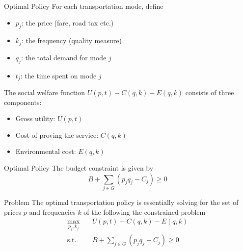 \documentclass[10pt, aspectratio=169]{beamer}
\begin{document}
\begin{frame}{Optimal Policy}
  For each transportation mode, define
  \begin{itemize}
    \item $p_j$: the price (fare, road tax etc.)
    \item $k_j$: the frequency (quality measure)
    \item $q_j$: the total demand for mode $j$
    \item $t_j$: the time spent on mode $j$
  \end{itemize}
  The social welfare function $U(p,t)-C(q,k)-E(q,k)$ consists of three components:
  \begin{itemize}
    \item Gross utility: $U(p,t)$
    \item Cost of proving the service: $C(q,k)$
    \item Environmental cost: $E(q,k)$
  \end{itemize}

\end{frame}

\begin{frame}{Optimal Policy}
  The budget constraint is given by
  \begin{equation*}
    B+\sum_{j\in G} (p_j q_j - C_j)\ge 0
  \end{equation*}
  \begin{block}{Problem}
    The optimal transportation policy is essentially solving for the set of \alert{ prices $p$ and frequencies $k$} of the following the constrained problem
    \begin{equation*}
      \begin{split}
        \max_{p_j,k_j} & \quad U(p,t)-C(q,k)-E(q,k)                 \\
        \text{s.t.}    & \quad B+\sum_{j\in G} (p_j q_j - C_j)\ge 0
      \end{split}
    \end{equation*}
  \end{block}
\end{frame}
\end{document}
